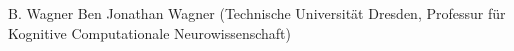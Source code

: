 
                {B.  Wagner}
                {Ben Jonathan Wagner (Technische Universität Dresden, Professur für Kognitive Computationale Neurowissenschaft)}
                